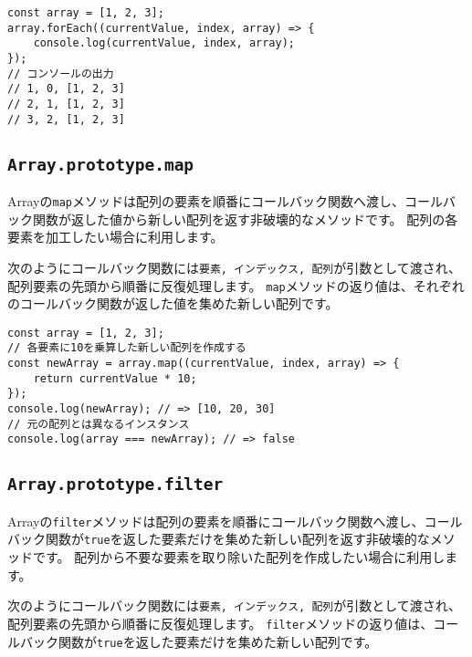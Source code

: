 \begin{lstlisting}
const array = [1, 2, 3];
array.forEach((currentValue, index, array) => {
    console.log(currentValue, index, array);
});
// コンソールの出力
// 1, 0, [1, 2, 3]
// 2, 1, [1, 2, 3]
// 3, 2, [1, 2, 3]
\end{lstlisting}

\hypertarget{array-map}{%
\subsection{\texorpdfstring{\texttt{Array.prototype.map}}{Array.prototype.map}}\label{array-map}}

Arrayの\texttt{map}メソッドは配列の要素を順番にコールバック関数へ渡し、コールバック関数が返した値から新しい配列を返す非破壊的なメソッドです。
配列の各要素を加工したい場合に利用します。

次のようにコールバック関数には\texttt{要素, インデックス, 配列}が引数として渡され、配列要素の先頭から順番に反復処理します。
\texttt{map}メソッドの返り値は、それぞれのコールバック関数が返した値を集めた新しい配列です。

\begin{lstlisting}
const array = [1, 2, 3];
// 各要素に10を乗算した新しい配列を作成する
const newArray = array.map((currentValue, index, array) => {
    return currentValue * 10;
});
console.log(newArray); // => [10, 20, 30]
// 元の配列とは異なるインスタンス
console.log(array === newArray); // => false
\end{lstlisting}

\hypertarget{array-filter}{%
\subsection{\texorpdfstring{\texttt{Array.prototype.filter}}{Array.prototype.filter}}\label{array-filter}}

Arrayの\texttt{filter}メソッドは配列の要素を順番にコールバック関数へ渡し、コールバック関数が\texttt{true}を返した要素だけを集めた新しい配列を返す非破壊的なメソッドです。
配列から不要な要素を取り除いた配列を作成したい場合に利用します。

次のようにコールバック関数には\texttt{要素, インデックス, 配列}が引数として渡され、配列要素の先頭から順番に反復処理します。
\texttt{filter}メソッドの返り値は、コールバック関数が\texttt{true}を返した要素だけを集めた新しい配列です。

